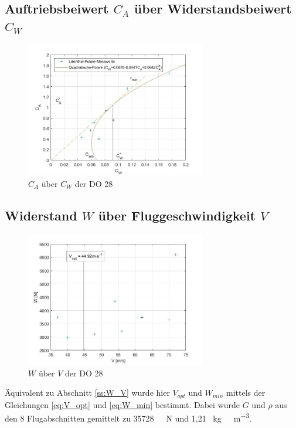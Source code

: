 \subsection{Auftriebsbeiwert $C_{A}$ über Widerstandsbeiwert $C_{W}$}

\begin{figure}[H]
	\centering	\includegraphics[width=0.7\textwidth]{./Bilder/CA_CW_DO28_NEU.jpg}
	\caption{$C_{A}$ über $C_{W}$ der DO 28}
	\label{fig:CA_CW_DO28}
\end{figure}

\subsection{Widerstand $W$ über Fluggeschwindigkeit $V$}

\begin{figure}[H]
	\centering	\includegraphics[width=0.7\textwidth]{./Bilder/W_V_DO28_NEU.jpg}
	\caption{$W$ über $V$ der DO 28}
	\label{fig:W_V_DO28}
\end{figure}

Äquivalent zu Abschnitt \ref{ss:W_V} wurde hier $V_{opt}$ und $W_{min}$ mittels der Gleichungen \ref{eq:V_opt} und \ref{eq:W_min} bestimmt. Dabei wurde $G$ und $\rho$ aus den 8 Flugabschnitten gemittelt zu \SI{35728}{\ \newton} und 1,21 \SI{}{\kilogram\ \meter^{-3}}.

